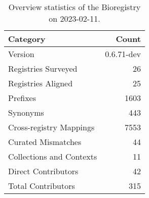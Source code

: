 \begin{table}
\centering
\caption{Overview statistics of the Bioregistry on 2023-02-11.}
\label{tab:bioregistry-summary}
\begin{tabular}{lr}
\toprule
                Category &      Count \\
\midrule
                 Version & 0.6.71-dev \\
     Registries Surveyed &         26 \\
      Registries Aligned &         25 \\
                Prefixes &       1603 \\
                Synonyms &        443 \\
 Cross-registry Mappings &       7553 \\
      Curated Mismatches &         44 \\
Collections and Contexts &         11 \\
     Direct Contributors &         42 \\
      Total Contributors &        315 \\
\bottomrule
\end{tabular}
\end{table}
